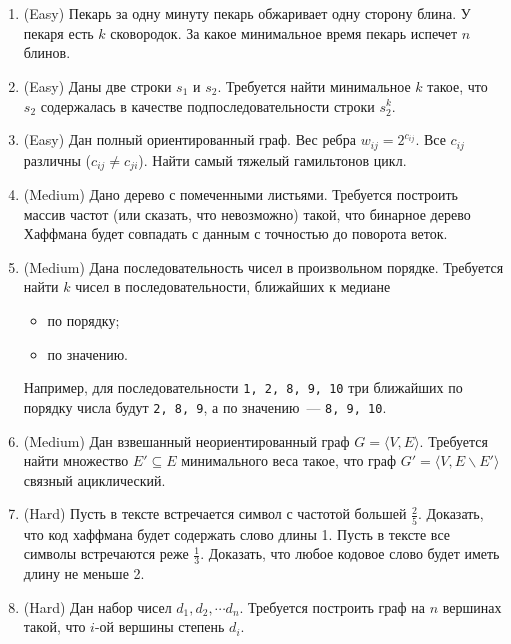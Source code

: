\section{}

\begin{enumerate}

  \item (Easy) Пекарь за одну минуту пекарь обжаривает
  одну сторону блина. У пекаря есть $k$ сковородок. За какое минимальное
  время пекарь испечет $n$ блинов.	

  \item (Easy) Даны две строки $s_1$ и $s_2$. Требуется найти минимальное
  $k$ такое, что $s_2$ содержалась в качестве подпоследовательности строки
  $s_2^k$.

  \item (Easy) Дан полный ориентированный граф. Вес ребра $w_{ij} = 2^{c_{ij}}$.
  Все $c_{ij}$ различны ($c_{ij} \neq c_{ji}$). Найти самый тяжелый гамильтонов
  цикл.

  \item (Medium) Дано дерево с помеченными листьями. Требуется построить массив
  частот (или сказать, что невозможно) такой, что бинарное дерево Хаффмана будет
  совпадать с данным с точностью до поворота веток.

  \item (Medium) Дана последовательность чисел в произвольном порядке. Требуется
  найти $k$ чисел в последовательности, ближайших к медиане
    \begin{itemize}
      \item по порядку;
      \item по значению.
    \end{itemize}
  Например, для последовательности \texttt{1, 2, 8, 9, 10} три ближайших по порядку
  числа будут \texttt{2, 8, 9}, а по значению~--- \texttt{8, 9, 10}.
   
  \item (Medium) Дан взвешанный неориентированный граф $G = \langle V, E \rangle$. 
  Требуется найти множество $E' \subseteq E$ минимального веса такое, что граф
  $G' = \langle V, E \backslash E' \rangle$ связный ациклический.

  \item (Hard) Пусть в тексте встречается символ с частотой большей $\frac{2}{5}$.
  Доказать, что код хаффмана будет содержать слово длины 1. Пусть в тексте
  все символы встречаются реже $\frac{1}{3}$. Доказать, что любое кодовое
  слово будет иметь длину не меньше 2.
  
  \item (Hard) Дан набор чисел $d_1, d_2, \cdots d_n$. Требуется построить 
  граф на $n$ вершинах такой, что $i$-ой вершины степень $d_i$.  

\end{enumerate}
